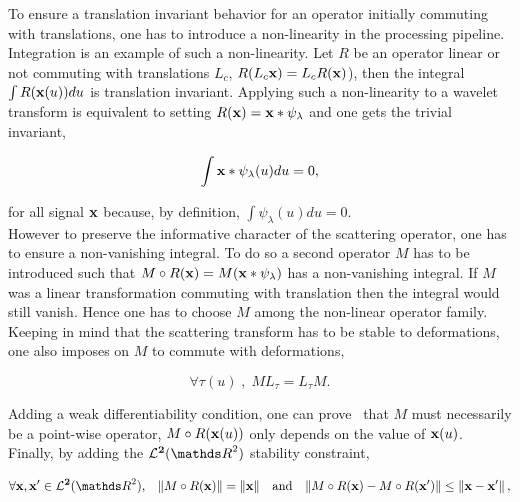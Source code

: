 \documentclass[a4paper,11pt]{report}
\begin{document}
      To ensure a translation invariant behavior for an operator initially commuting with translations, one has to introduce a non-linearity in the processing pipeline. Integration is an example of such a non-linearity. Let $R$ be an operator linear or not commuting with translations $L_{c}$, \ie $R(L_{c}{\bf x}) = L_{c}R({\bf x})$), then the integral $\int R({\bf x}(u))du$ is  translation invariant. Applying such a non-linearity to a wavelet transform is equivalent to setting $R({\bf x}) = {\bf x} \ast \psi_{\lambda}$ and one gets the trivial invariant, 
      
      \begin{equation*}
				\label{eq:Trivial invariant}
				\int {\bf x} \ast \psi_{\lambda}(u)du = 0,
      \end{equation*}
      
      for all signal ${\bf x}$ because, by definition, $\int \psi_{\lambda}(u)du = 0$.\\
      
      However to preserve the informative character of the scattering operator, one has to ensure a non-vanishing integral. To do so a second operator $M$ has to be introduced such that $M \circ R({\bf x}) = M({\bf x} \ast \psi_{\lambda})$ has a non-vanishing integral. If $M$ was a linear transformation commuting with translation then the integral would still vanish. Hence one has to choose $M$ among the non-linear operator family.\\
      
      Keeping in mind that the scattering transform has to be stable to deformations, one also imposes on $M$ to commute with deformations, 
      
      \begin{equation*}
				\label{eq:Commute with deformations}
				\forall \tau(u) \; , \; M L_{\tau} = L_{\tau} M.
      \end{equation*}
      
      Adding a weak differentiability condition, one can prove~\citep{bruna2012commute} that $M$ must necessarily be a point-wise operator, \ie $M \circ R({\bf x}(u))$ only depends on the value of ${\bf x}(u)$.\\
      
      Finally, by adding the $\mathbf{\mcalL^{2}}(\dsR^{2})$ stability constraint,
      
      \begin{equation*}
				\label{eq:L2 stability}
				\forall \bfx,\bfx' \in \mathbf{\mcalL^{2}}(\dsR^{2}), \;\;\; 
				\norm{M \circ R(\bfx)} = \norm{\bfx} 
				\;\;\; \text{and} \;\;\;
				\norm{M \circ R(\bfx) - M \circ R(\bfx')} \leq \norm{\bfx-\bfx'},
      \end{equation*}     
      
\end{document}

